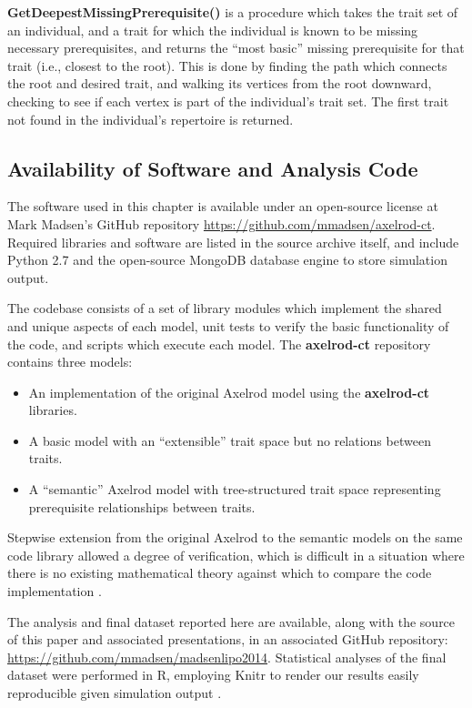 \documentclass[graybox,natbib]{svmult}
\begin{document}
\textbf{GetDeepestMissingPrerequisite()} is a procedure which takes the
trait set of an individual, and a trait for which the individual is
known to be missing necessary prerequisites, and returns the ``most
basic'' missing prerequisite for that trait (i.e., closest to the root).
This is done by finding the path which connects the root and desired
trait, and walking its vertices from the root downward, checking to see
if each vertex is part of the individual's trait set. The first trait
not found in the individual's repertoire is returned.

\subsection{Availability of Software and Analysis
Code}\label{availability-of-software-and-analysis-code}

The software used in this chapter is available under an open-source
license at Mark Madsen's GitHub repository
\url{https://github.com/mmadsen/axelrod-ct}. Required libraries and
software are listed in the source archive itself, and include Python 2.7
and the open-source MongoDB database engine to store simulation output.

The codebase consists of a set of library modules which implement the
shared and unique aspects of each model, unit tests to verify the basic
functionality of the code, and scripts which execute each model. The
\textbf{axelrod-ct} repository contains three models:

\begin{itemize}
\item
  An implementation of the original Axelrod model using the
  \textbf{axelrod-ct} libraries.
\item
  A basic model with an ``extensible'' trait space but no relations
  between traits.
\item
  A ``semantic'' Axelrod model with tree-structured trait space
  representing prerequisite relationships between traits.
\end{itemize}

Stepwise extension from the original Axelrod to the semantic models on
the same code library allowed a degree of verification, which is
difficult in a situation where there is no existing mathematical theory
against which to compare the code implementation
\citep{national2012Assessing}.

The analysis and final dataset reported here are available, along with
the source of this paper and associated presentations, in an associated
GitHub repository: \url{https://github.com/mmadsen/madsenlipo2014}.
Statistical analyses of the final dataset were performed in R, employing
Knitr to render our results easily reproducible given simulation output
\citep{xie2013dynamic}.





\end{document}
